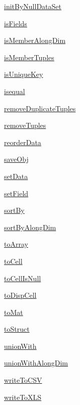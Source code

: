 \begin{list}{}{}
 \item \hyperref[method:smartdb.relations.ATypifiedStaticRelation.initByNullDataSet]{initByNullDataSet}
 \item \hyperref[method:smartdb.relations.ATypifiedStaticRelation.isFields]{isFields}
 \item \hyperref[method:smartdb.relations.ATypifiedStaticRelation.isMemberAlongDim]{isMemberAlongDim}
 \item \hyperref[method:smartdb.relations.ATypifiedStaticRelation.isMemberTuples]{isMemberTuples}
 \item \hyperref[method:smartdb.relations.ATypifiedStaticRelation.isUniqueKey]{isUniqueKey}
 \item \hyperref[method:smartdb.relations.ATypifiedStaticRelation.isequal]{isequal}
 \item \hyperref[method:smartdb.relations.ATypifiedStaticRelation.removeDuplicateTuples]{removeDuplicateTuples}
 \item \hyperref[method:smartdb.relations.ATypifiedStaticRelation.removeTuples]{removeTuples}
 \item \hyperref[method:smartdb.relations.ATypifiedStaticRelation.reorderData]{reorderData}
 \item \hyperref[method:smartdb.relations.ATypifiedStaticRelation.saveObj]{saveObj}
 \item \hyperref[method:smartdb.relations.ATypifiedStaticRelation.setData]{setData}
 \item \hyperref[method:smartdb.relations.ATypifiedStaticRelation.setField]{setField}
 \item \hyperref[method:smartdb.relations.ATypifiedStaticRelation.sortBy]{sortBy}
 \item \hyperref[method:smartdb.relations.ATypifiedStaticRelation.sortByAlongDim]{sortByAlongDim}
 \item \hyperref[method:smartdb.relations.ATypifiedStaticRelation.toArray]{toArray}
 \item \hyperref[method:smartdb.relations.ATypifiedStaticRelation.toCell]{toCell}
 \item \hyperref[method:smartdb.relations.ATypifiedStaticRelation.toCellIsNull]{toCellIsNull}
 \item \hyperref[method:smartdb.relations.ATypifiedStaticRelation.toDispCell]{toDispCell}
 \item \hyperref[method:smartdb.relations.ATypifiedStaticRelation.toMat]{toMat}
 \item \hyperref[method:smartdb.relations.ATypifiedStaticRelation.toStruct]{toStruct}
 \item \hyperref[method:smartdb.relations.ATypifiedStaticRelation.unionWith]{unionWith}
 \item \hyperref[method:smartdb.relations.ATypifiedStaticRelation.unionWithAlongDim]{unionWithAlongDim}
 \item \hyperref[method:smartdb.relations.ATypifiedStaticRelation.writeToCSV]{writeToCSV}
 \item \hyperref[method:smartdb.relations.ATypifiedStaticRelation.writeToXLS]{writeToXLS}
\end{list}
